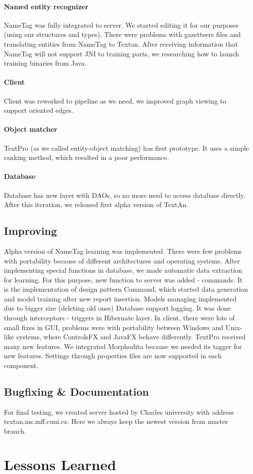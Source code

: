 \paragraph{Named entity recognizer} NameTag was fully integrated to server. We 
started editing it for our purposes (using our structures and types). There were
problems with gazetteers files and translating entities from NameTag to Textan.
After receiving information that NameTag will not support JNI to training parts,
 we researching how to launch training binaries from Java.
\paragraph{Client} Client was reworked to pipeline as we need, we improved graph
 viewing to support oriented edges.
\paragraph{Object matcher} TextPro (as we called entity-object matching) has first
 prototype. It uses a simple ranking method, which resulted in a poor performance. 
\paragraph{Database} Database has new layer with DAOs, so no more need to access
database directly. After this iteration, we released first alpha version of TextAn.

\subsection{Improving}
Alpha version of NameTag learning was implemented. There were few problems with
portability because of different architectures and operating systems. After
implementing special functions in database, we made automatic data extraction for
learning. For this purpose, new function to server was added - commands. It is
the implementation of design pattern Command, which started data generation and
model training after new report insertion. Models managing implemented due to
bigger size (deleting old ones) Database support logging. It was done through
interceptors - triggers in Hibernate layer. In client, there were lots of small
fixes in GUI, problems were with portability between Windows and Unix-like systems,
where ControlsFX and JavaFX behave differently. TextPro received many new features.
We integrated Morphodita because we needed its tagger for new features.
Settings through properties files are now supported in each component.

\subsection{Bugfixing \& Documentation}
For final testing, we created server hosted by Charles university with address textan.ms.mff.cuni.cz.
Here we always keep the newest version from master branch.

\section{Lessons Learned}
